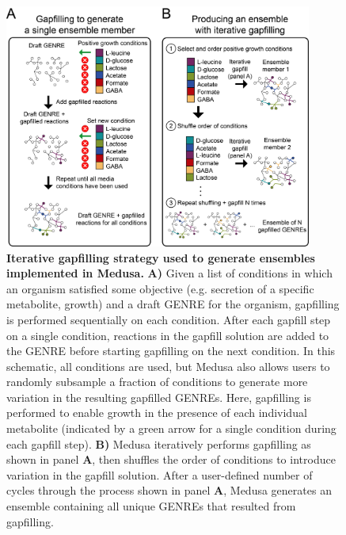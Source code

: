 \documentclass[11pt,twocolumn,notitlepage,openany,twoside]{book}
\begin{document}
\begin{refsection}
\begin{figure}[!tb]
\centering
\includegraphics[width=0.9\textwidth]{ch4_fig4}
\caption[ Iterative gapfilling strategy used to generate ensembles implemented in Medusa.]{\textbf{ Iterative gapfilling strategy used to generate ensembles implemented in Medusa.}  \textbf{A)} Given a list of conditions in which an organism satisfied some objective (e.g. secretion of a specific metabolite, growth) and a draft GENRE for the organism, gapfilling is performed sequentially on each condition. After each gapfill step on a single condition, reactions in the gapfill solution are added to the GENRE before starting gapfilling on the next condition. In this schematic, all conditions are used, but Medusa also allows users to randomly subsample a fraction of conditions to generate more variation in the resulting gapfilled GENREs. Here, gapfilling is performed to enable growth in the presence of each individual metabolite (indicated by a green arrow for a single condition during each gapfill step). \textbf{B)} Medusa iteratively performs gapfilling as shown in panel \textbf{A}, then shuffles the order of conditions to introduce variation in the gapfill solution. After a user-defined number of cycles through the process shown in panel \textbf{A}, Medusa generates an ensemble containing all unique GENREs that resulted from gapfilling.}
\end{figure}


\end{refsection}
\end{document}
